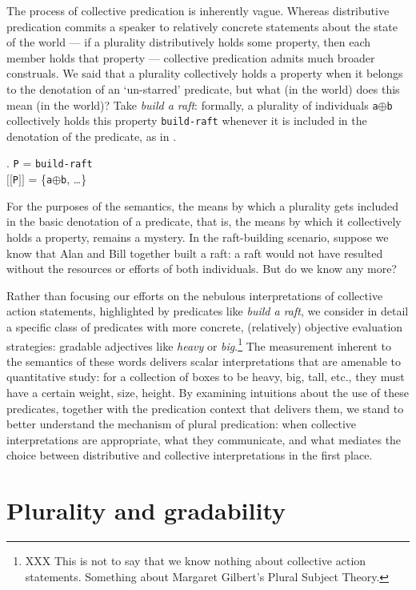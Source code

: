 \documentclass[linguex]{sp}
\newcommand{\sem}[1]{\mbox{$[\![$#1$]\!]$}}
\renewcommand{\tt}{\texttt}
\newcommand{\op}{$\oplus$}
\begin{document}
The process of collective predication is inherently vague. Whereas distributive predication commits a speaker to relatively concrete statements about the state of the world --- if a plurality distributively holds some property, then each member holds that property --- collective predication admits much broader construals. We said that a plurality collectively holds a property when it belongs to the denotation of an `un-starred' predicate, but what (in the world) does this mean (in the world)? Take \emph{build a raft}: formally, a plurality of individuals \tt{a}\op\tt{b} collectively holds this property \tt{build-raft} whenever it is included in the denotation of the predicate, as in \Next.

\ex. \tt{P} = \tt{build-raft}\\
\sem{\tt{P}} = \{\tt{a}\op\tt{b}, \ldots\}

For the purposes of the semantics, the means by which a plurality gets included in the basic denotation of a predicate, that is, the means by which it collectively holds a property, remains a mystery. In the raft-building scenario, suppose we know that Alan and Bill together built a raft: a raft would not have resulted without the resources or efforts of both individuals. But do we know any more?

Rather than focusing our efforts on the nebulous interpretations of collective action statements, highlighted by predicates like \emph{build a raft}, we consider in detail a specific class of predicates with more concrete, (relatively) objective evaluation strategies: gradable adjectives like \emph{heavy} or \emph{big}.\footnote{XXX This is not to say that we know nothing about collective action statements. Something about Margaret Gilbert's Plural Subject Theory.} The measurement inherent to the semantics of these words delivers scalar interpretations that are amenable to quantitative study: for a collection of boxes to be heavy, big, tall, etc., they must have a certain weight, size, height. By examining intuitions about the use of these predicates, together with the predication context that delivers them, we stand to better understand the mechanism of plural predication: when collective interpretations are appropriate, what they communicate, and what mediates the choice between distributive and collective interpretations in the first place.


\section{Plurality and gradability}
\end{document}

